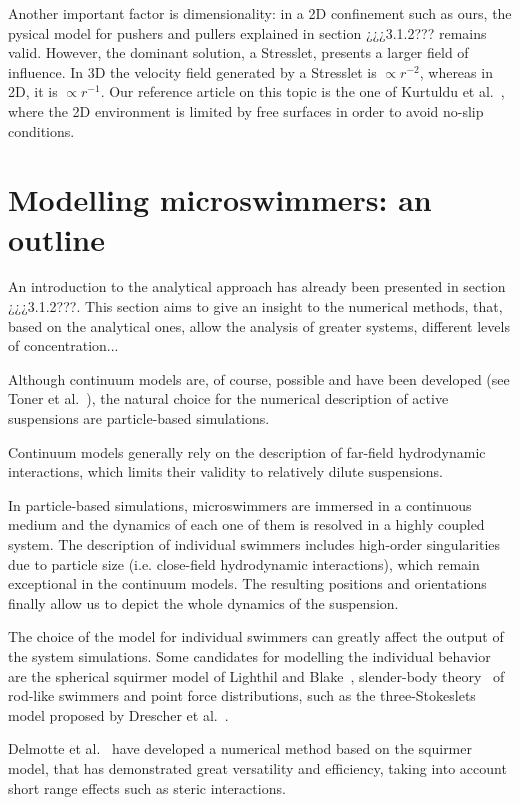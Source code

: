 Another important factor is dimensionality: in a 2D confinement such as ours, the pysical model for pushers and pullers explained in section ¿¿¿3.1.2??? remains valid. However, the dominant solution, a Stresslet, presents a larger field of influence. In 3D the velocity field generated by a Stresslet is $\propto r^{-2}$, whereas in 2D, it is $\propto r^{-1}$. Our reference article on this topic is the one of Kurtuldu et al.~\cite{Kurtuldu2011}, where the 2D environment is limited by free surfaces in order to avoid no-slip conditions. 

\section{Modelling microswimmers: an outline}

An introduction to the analytical approach has already been presented in section ¿¿¿3.1.2???. This section aims to give an insight to the numerical methods, that, based on the analytical ones, allow the analysis of greater systems, different levels of concentration...

Although continuum models are, of course, possible and have been developed (see Toner et al.~\cite{Toner}), the natural choice for the numerical description of active suspensions are particle-based simulations. 

Continuum models generally rely on the description of far-field hydrodynamic interactions, which limits their validity to relatively dilute suspensions.

In particle-based simulations, microswimmers are immersed in a continuous medium and the dynamics of each one of them is resolved in a highly coupled system. The description of individual swimmers includes high-order singularities due to particle size (i.e. close-field hydrodynamic interactions), which remain exceptional in the continuum models. The resulting positions and orientations finally allow us to depict the whole dynamics of the suspension.

The choice of the model for individual swimmers can greatly affect the output of the system simulations. Some candidates for modelling the individual behavior are the spherical squirmer model of Lighthil and Blake~\cite{Blake}, slender-body theory~\cite{batchelor_1970} of rod-like swimmers and point force distributions, such as the three-Stokeslets model proposed by Drescher et al.~\cite{Drescher2010}.

Delmotte et al.~\cite{Delmotte2015} have developed a numerical method based on the squirmer model, that has demonstrated great versatility and efficiency, taking into account short range effects such as steric interactions. 

